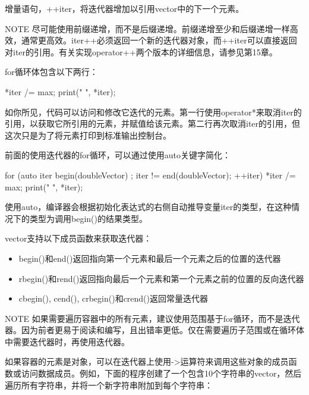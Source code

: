增量语句，++iter，将迭代器增加以引用vector中的下一个元素。

\begin{myNotic}{NOTE}
尽可能使用前缀递增，而不是后缀递增。前缀递增至少和后缀递增一样高效，通常更高效。iter++必须返回一个新的迭代器对象，而++iter可以直接返回对iter的引用。有关实现operator++两个版本的详细信息，请参见第15章。
\end{myNotic}

for循环体包含以下两行：

\begin{cpp}
*iter /= max;
print("{} ", *iter);
\end{cpp}

如你所见，代码可以访问和修改它迭代的元素。第一行使用operator*来取消iter的引用，以获取它所引用的元素，并赋值给该元素。第二行再次取消iter的引用，但这次只是为了将元素打印到标准输出控制台。

前面的使用迭代器的for循环，可以通过使用auto关键字简化：

\begin{cpp}
for (auto iter { begin(doubleVector) };
    iter != end(doubleVector); ++iter) {
    *iter /= max;
    print("{} ", *iter);
}
\end{cpp}

使用auto，编译器会根据初始化表达式的右侧自动推导变量iter的类型，在这种情况下的类型为调用begin()的结果类型。

vector支持以下成员函数来获取迭代器：

\begin{itemize}
\item
begin()和end()返回指向第一个元素和最后一个元素之后的位置的迭代器

\item
rbegin()和rend()返回指向最后一个元素和第一个元素之前的位置的反向迭代器

\item
cbegin(), cend(), crbegin()和crend()返回常量迭代器
\end{itemize}

\begin{myNotic}{NOTE}
如果需要遍历容器中的所有元素，建议使用范围基于for循环，而不是迭代器。因为前者更易于阅读和编写，且出错率更低。仅在需要遍历子范围或在循环体中需要迭代器时，再使用迭代器。
\end{myNotic}


如果容器的元素是对象，可以在迭代器上使用->运算符来调用这些对象的成员函数或访问数据成员。例如，下面的程序创建了一个包含10个字符串的vector，然后遍历所有字符串，并将一个新字符串附加到每个字符串：

